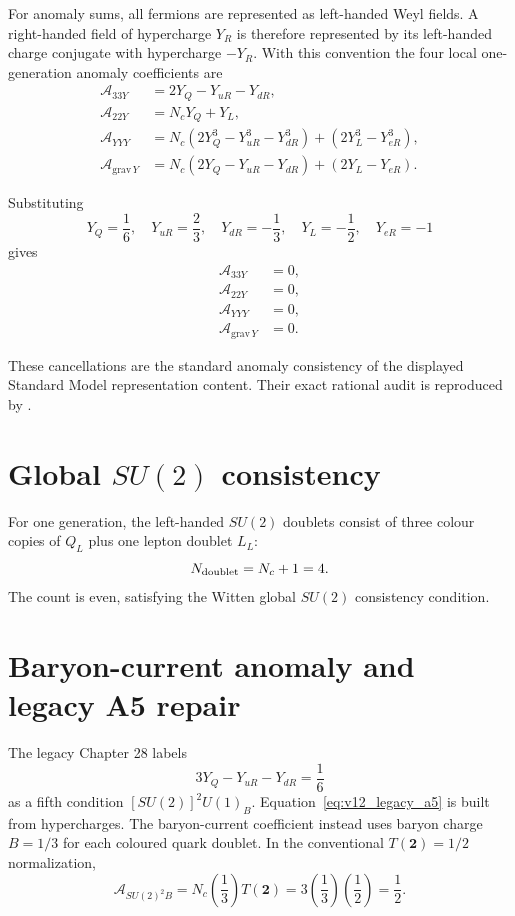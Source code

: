 For anomaly sums, all fermions are represented as left-handed Weyl fields. A right-handed field of hypercharge $Y_R$ is therefore represented by its left-handed charge conjugate with hypercharge $-Y_R$. With this convention the four local one-generation anomaly coefficients are
\begin{align}
\mathcal A_{33Y}
&=2Y_Q-Y_{uR}-Y_{dR},\\
\mathcal A_{22Y}
&=N_cY_Q+Y_L,\\
\mathcal A_{YYY}
&=N_c\left(2Y_Q^3-Y_{uR}^3-Y_{dR}^3\right)
 +\left(2Y_L^3-Y_{eR}^3\right),\\
\mathcal A_{\mathrm{grav}\,Y}
&=N_c\left(2Y_Q-Y_{uR}-Y_{dR}\right)
 +\left(2Y_L-Y_{eR}\right).
\end{align}

Substituting
\[
Y_Q=\frac16,\quad
Y_{uR}=\frac23,\quad
Y_{dR}=-\frac13,\quad
Y_L=-\frac12,\quad
Y_{eR}=-1
\]
gives
\begin{align}
\mathcal A_{33Y}&=0,\\
\mathcal A_{22Y}&=0,\\
\mathcal A_{YYY}&=0,\\
\mathcal A_{\mathrm{grav}\,Y}&=0.
\end{align}

These cancellations are the standard anomaly consistency of the displayed Standard Model representation content. Their exact rational audit is reproduced by
.

\section[Global SU(2) consistency]{Global $SU(2)$ consistency}

For one generation, the left-handed $SU(2)$ doublets consist of three colour copies of $Q_L$ plus one lepton doublet $L_L$:
\[
N_{\rm doublet}=N_c+1=4.
\]
The count is even, satisfying the Witten global $SU(2)$ consistency condition.

\section{Baryon-current anomaly and legacy A5 repair}

The legacy Chapter 28 labels
\begin{equation}
3Y_Q-Y_{uR}-Y_{dR}=\frac16
\label{eq:v12_legacy_a5}
\end{equation}
as a fifth condition $[SU(2)]^2U(1)_B$. Equation~\eqref{eq:v12_legacy_a5} is built from hypercharges. The baryon-current coefficient instead uses baryon charge $B=1/3$ for each coloured quark doublet. In the conventional $T(\mathbf2)=1/2$ normalization,
\begin{equation}
\boxed{
\mathcal A_{SU(2)^2B}
=N_c\left(\frac13\right)T(\mathbf2)
=3\left(\frac13\right)\left(\frac12\right)
=\frac12.
}
\end{equation}


